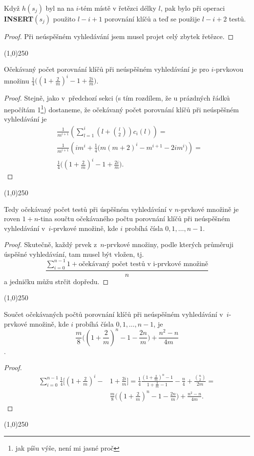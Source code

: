 \documentclass[a4paper,12pt]{article}
\newenvironment{myproof}{
  \begin{proof}
    
  }{
  \end{proof}
  \begin{center}
   \line(1,0){250}
   \end{center}
  }
\begin{document}
\begin{lemma}[verze $>0$]
Když $h(s_{j})$ byl na na $i$-tém místě v řetězci délky $
l$, pak bylo 
při operaci {\bf INSERT$(s_{j})$} použito $l-i+1$ porovnání klíčů
a teď se použije $l-i+2$ testů.
\end{lemma}
\begin{myproof}
    Při neúspěšném vyhledávání jsem musel projet celý zbytek řetězce.
\end{myproof}

\begin{lemma}
    Očekávaný počet 
    porovnání klíčů při neúspěšném vyhledávání je pro $i$-prvkovou množinu $\frac 14\big((1+\frac 2m)^i-1+\frac {2i}m\big)$.
\end{lemma}
\begin{myproof}
    Stejně, jako v~předchozí sekci (s tím rozdílem, že u prázdných řádků nepočítám 1\footnote{jak píšu výše, není mi jasné proč}) dostaneme, že očekávaný počet 
porovnání klíčů při neúspěšném vyhledávání je 
\begin{align*}&\frac 1{m^{i+1}}(\sum_{l=1}^i(l+\binom l2)c_i(l))=\\
&\frac 1{m^{i+1}}(im^i+\frac 14\big(m(m+2)^i-m^{i+1}-2im^i\big))=\\
&\frac 14\big((1+\frac 2m)^i-1+\frac {2i}m\big).\end{align*}
\end{myproof}

\begin{lemma}
Tedy očekávaný počet testů při úspěšném 
vy\-hledávání v $n$-prvkové množině je 
roven $1+n$-tina součtu očekávaného počtu porovnání 
klíčů při neúspěšném vy\-hledávání v~$
i$-prvkové 
množině, kde $i$ probíhá čísla $0,1,\dots,n-1$.
\end{lemma}
\begin{myproof}
    Skutečně, každý prvek z~$n$-prvkové množiny, podle kterých průměruji úspěšné vyhledávání, tam musel být vložen, tj. $$\frac{\sum_{i=0}^{n-1}1+\mbox{očekávaný počet testů v i-prvkové množině}}{n}$$ a jedničku můžu strčit dopředu.
\end{myproof}

\begin{lemma}
    Součet očekávaných počtů porovnání 
    klíčů při neúspěšném vy\-hledávání v~$
    i$-prvkové 
    množině, kde $i$ probíhá čísla $0,1,\dots,n-1$, je $$\frac m8\big((1+\frac 2m)^n-1-\frac {2n}m\big)+\frac {n^2-n}{4m}$$.
\end{lemma}
\begin{myproof} 
\begin{align*}\sum_{i=0}^{n-1}\frac 14\big[(1+\frac 2m)^i-&1+\frac {2i}
m\big]=\frac 14\frac {(1+\frac 2m)^n-1}{1+\frac 2m-1}-\frac n4+\frac {\binom 
n2}{2m}=\\
&\frac m8\big((1+\frac 2m)^n-1-\frac {2n}m\big)+\frac {n^2-n}{4m}
.\end{align*}
\end{myproof}
\end{document}
